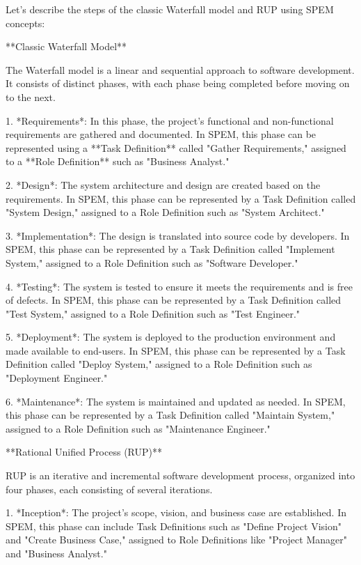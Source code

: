 \documentclass{article}
\begin{document}
Let's describe the steps of the classic Waterfall model and RUP using SPEM concepts:

**Classic Waterfall Model**

The Waterfall model is a linear and sequential approach to software development. It consists of distinct phases, with each phase being completed before moving on to the next.

1. *Requirements*: In this phase, the project's functional and non-functional requirements are gathered and documented. In SPEM, this phase can be represented using a **Task Definition** called "Gather Requirements," assigned to a **Role Definition** such as "Business Analyst."

2. *Design*: The system architecture and design are created based on the requirements. In SPEM, this phase can be represented by a Task Definition called "System Design," assigned to a Role Definition such as "System Architect."

3. *Implementation*: The design is translated into source code by developers. In SPEM, this phase can be represented by a Task Definition called "Implement System," assigned to a Role Definition such as "Software Developer."

4. *Testing*: The system is tested to ensure it meets the requirements and is free of defects. In SPEM, this phase can be represented by a Task Definition called "Test System," assigned to a Role Definition such as "Test Engineer."

5. *Deployment*: The system is deployed to the production environment and made available to end-users. In SPEM, this phase can be represented by a Task Definition called "Deploy System," assigned to a Role Definition such as "Deployment Engineer."

6. *Maintenance*: The system is maintained and updated as needed. In SPEM, this phase can be represented by a Task Definition called "Maintain System," assigned to a Role Definition such as "Maintenance Engineer."

**Rational Unified Process (RUP)**

RUP is an iterative and incremental software development process, organized into four phases, each consisting of several iterations.

1. *Inception*: The project's scope, vision, and business case are established. In SPEM, this phase can include Task Definitions such as "Define Project Vision" and "Create Business Case," assigned to Role Definitions like "Project Manager" and "Business Analyst."
\end{document}
